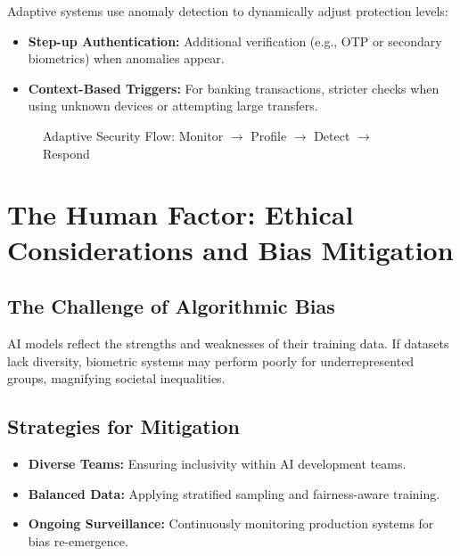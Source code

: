 \documentclass[12pt,a4paper]{report}
\begin{document}
Adaptive systems use anomaly detection to dynamically adjust protection levels:

\begin{itemize}
    \item \textbf{Step-up Authentication:} Additional verification (e.g., OTP or secondary biometrics) when anomalies appear.  
    \item \textbf{Context-Based Triggers:} For banking transactions, stricter checks when using unknown devices or attempting large transfers.  
\end{itemize}

\begin{figure}[h!]
    \centering
    \caption{Adaptive Security Flow: Monitor $\rightarrow$ Profile $\rightarrow$ Detect $\rightarrow$ Respond}
    \label{fig:adaptiveflow}
\end{figure}

\section{The Human Factor: Ethical Considerations and Bias Mitigation}

\subsection{The Challenge of Algorithmic Bias}

AI models reflect the strengths and weaknesses of their training data. If datasets lack diversity, biometric systems may perform poorly for underrepresented groups, magnifying societal inequalities.

\subsection{Strategies for Mitigation}

\begin{itemize}
    \item \textbf{Diverse Teams:} Ensuring inclusivity within AI development teams.  
    \item \textbf{Balanced Data:} Applying stratified sampling and fairness-aware training.  
    \item \textbf{Ongoing Surveillance:} Continuously monitoring production systems for bias re-emergence.  
\end{itemize}
\end{document}
